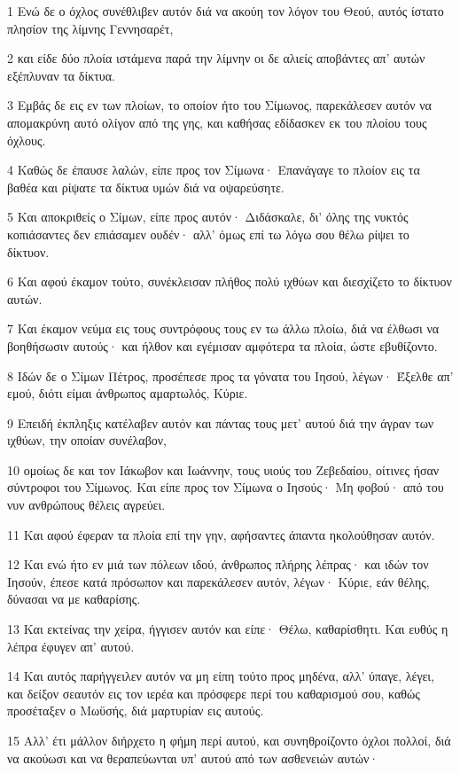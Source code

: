 \par 1 Ενώ δε ο όχλος συνέθλιβεν αυτόν διά να ακούη τον λόγον του Θεού, αυτός ίστατο πλησίον της λίμνης Γεννησαρέτ,
\par 2 και είδε δύο πλοία ιστάμενα παρά την λίμνην οι δε αλιείς αποβάντες απ' αυτών εξέπλυναν τα δίκτυα.
\par 3 Εμβάς δε εις εν των πλοίων, το οποίον ήτο του Σίμωνος, παρεκάλεσεν αυτόν να απομακρύνη αυτό ολίγον από της γης, και καθήσας εδίδασκεν εκ του πλοίου τους όχλους.
\par 4 Καθώς δε έπαυσε λαλών, είπε προς τον Σίμωνα· Επανάγαγε το πλοίον εις τα βαθέα και ρίψατε τα δίκτυα υμών διά να οψαρεύσητε.
\par 5 Και αποκριθείς ο Σίμων, είπε προς αυτόν· Διδάσκαλε, δι' όλης της νυκτός κοπιάσαντες δεν επιάσαμεν ουδέν· αλλ' όμως επί τω λόγω σου θέλω ρίψει το δίκτυον.
\par 6 Και αφού έκαμον τούτο, συνέκλεισαν πλήθος πολύ ιχθύων και διεσχίζετο το δίκτυον αυτών.
\par 7 Και έκαμον νεύμα εις τους συντρόφους τους εν τω άλλω πλοίω, διά να έλθωσι να βοηθήσωσιν αυτούς· και ήλθον και εγέμισαν αμφότερα τα πλοία, ώστε εβυθίζοντο.
\par 8 Ιδών δε ο Σίμων Πέτρος, προσέπεσε προς τα γόνατα του Ιησού, λέγων· Έξελθε απ' εμού, διότι είμαι άνθρωπος αμαρτωλός, Κύριε.
\par 9 Επειδή έκπληξις κατέλαβεν αυτόν και πάντας τους μετ' αυτού διά την άγραν των ιχθύων, την οποίαν συνέλαβον,
\par 10 ομοίως δε και τον Ιάκωβον και Ιωάννην, τους υιούς του Ζεβεδαίου, οίτινες ήσαν σύντροφοι του Σίμωνος. Και είπε προς τον Σίμωνα ο Ιησούς· Μη φοβού· από του νυν ανθρώπους θέλεις αγρεύει.
\par 11 Και αφού έφεραν τα πλοία επί την γην, αφήσαντες άπαντα ηκολούθησαν αυτόν.
\par 12 Και ενώ ήτο εν μιά των πόλεων ιδού, άνθρωπος πλήρης λέπρας· και ιδών τον Ιησούν, έπεσε κατά πρόσωπον και παρεκάλεσεν αυτόν, λέγων· Κύριε, εάν θέλης, δύνασαι να με καθαρίσης.
\par 13 Και εκτείνας την χείρα, ήγγισεν αυτόν και είπε· Θέλω, καθαρίσθητι. Και ευθύς η λέπρα έφυγεν απ' αυτού.
\par 14 Και αυτός παρήγγειλεν αυτόν να μη είπη τούτο προς μηδένα, αλλ' ύπαγε, λέγει, και δείξον σεαυτόν εις τον ιερέα και πρόσφερε περί του καθαρισμού σου, καθώς προσέταξεν ο Μωϋσής, διά μαρτυρίαν εις αυτούς.
\par 15 Αλλ' έτι μάλλον διήρχετο η φήμη περί αυτού, και συνηθροίζοντο όχλοι πολλοί, διά να ακούωσι και να θεραπεύωνται υπ' αυτού από των ασθενειών αυτών·
